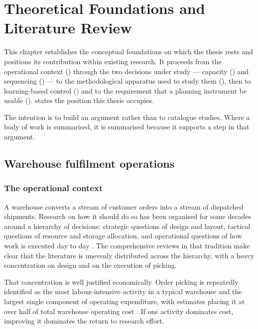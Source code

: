 \chapter{Theoretical Foundations and Literature Review}
\label{ch:theory}

This chapter establishes the conceptual foundations on which the thesis rests and positions its
contribution within existing research. It proceeds from the operational context
() through the two decisions under study --- capacity
() and sequencing () --- to the methodological
apparatus used to study them (), then to learning-based
control () and to the requirement that a planning instrument be usable
().  states the position this thesis occupies.

The intention is to build an argument rather than to catalogue studies. Where a body of work is
summarised, it is summarised because it supports a step in that argument.

\section{Warehouse fulfilment operations}
\label{sec:lit-warehouse}

\subsection{The operational context}

A warehouse converts a stream of customer orders into a stream of dispatched shipments. Research
on how it should do so has been organised for some decades around a hierarchy of decisions:
strategic questions of design and layout, tactical questions of resource and storage allocation,
and operational questions of how work is executed day to day \citep{gu2007,gu2010}. The
comprehensive reviews in that tradition make clear that the literature is unevenly distributed
across the hierarchy, with a heavy concentration on design and on the execution of picking.

That concentration is well justified economically. Order picking is repeatedly identified as the
most labour-intensive activity in a typical warehouse and the largest single component of
operating expenditure, with estimates placing it at over half of total warehouse operating cost
\citep{dekoster2007}. If one activity dominates cost, improving it dominates the return to
research effort.

